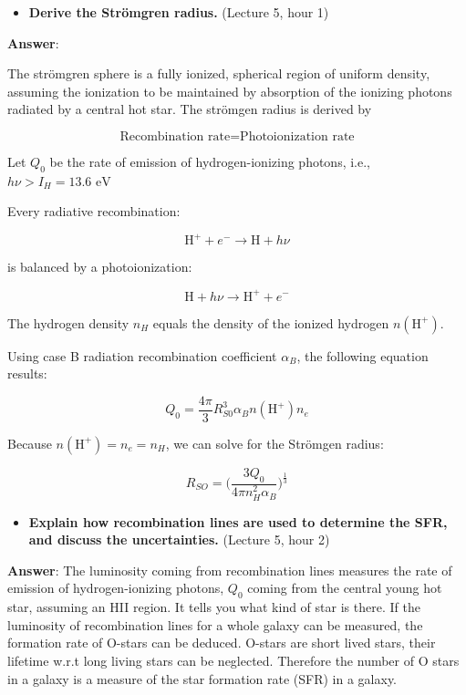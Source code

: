 \documentclass[11pt]{article}
\providecommand{\tightlist}{%
      \setlength{\itemsep}{0pt}\setlength{\parskip}{0pt}}
\begin{document}
    \begin{itemize}
\tightlist
\item
  \textbf{Derive the Strömgren radius.} (Lecture 5, hour 1)
\end{itemize}

\textbf{Answer}:

The strömgren sphere is a fully ionized, spherical region of uniform
density, assuming the ionization to be maintained by absorption of the
ionizing photons radiated by a central hot star. The strömgen radius is
derived by

\[ \text{Recombination rate} = \text{Photoionization rate} \]

Let \(Q_0\) be the rate of emission of hydrogen-ionizing photons, i.e.,
\(h\nu > I_H = 13.6 \text{ eV}\)

Every radiative recombination:

\[ \text{H}^+ + e^- \rightarrow \text{H} + h\nu \]

is balanced by a photoionization:

\[ \text{H} + h\nu \rightarrow \text{H}^+ + e^- \]

The hydrogen density \(n_H\) equals the density of the ionized hydrogen
\(n(\text{H}^+)\).

Using case B radiation recombination coefficient \(\alpha_B\), the
following equation results:

\[ Q_0 = \frac{4\pi}{3} R_{S0}^3 \alpha_B n(\text{H}^+) n_e \]

Because \(n(\text{H}^+) = n_e = n_H\), we can solve for the Strömgen
radius:

\[ R_{SO} = \bigg( \frac{3 Q_0}{4 \pi n_H^2 \alpha_B} \bigg)^\frac{1}{3} \]

    \begin{itemize}
\tightlist
\item
  \textbf{Explain how recombination lines are used to determine the SFR,
  and discuss the uncertainties.} (Lecture 5, hour 2)
\end{itemize}

\textbf{Answer}: The luminosity coming from recombination lines measures
the rate of emission of hydrogen-ionizing photons, \(Q_0\) coming from
the central young hot star, assuming an HII region. It tells you what
kind of star is there. If the luminosity of recombination lines for a
whole galaxy can be measured, the formation rate of O-stars can be
deduced. O-stars are short lived stars, their lifetime w.r.t long living
stars can be neglected. Therefore the number of O stars in a galaxy is a
measure of the star formation rate (SFR) in a galaxy.
\end{document}
